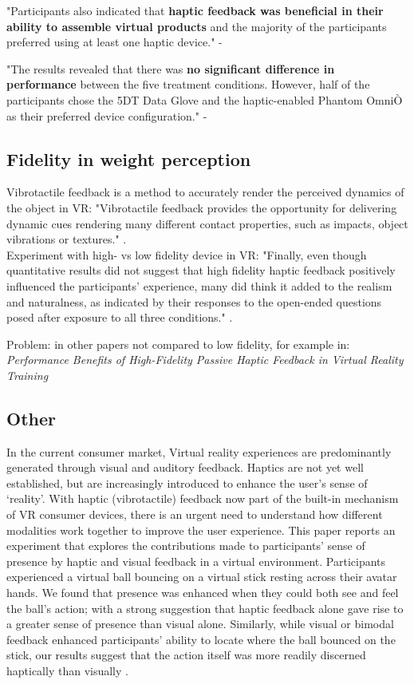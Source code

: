 "Participants also indicated that \textbf{haptic
feedback was beneficial in their ability to assemble virtual
products} and the majority of the participants preferred
using at least one haptic device." - \cite{Carlson2016}

"The results revealed that there
was \textbf{no significant difference in performance} between the
five treatment conditions. However, half of the participants
chose the 5DT Data Glove and the haptic-enabled Phantom
OmniÒ as their preferred device configuration." - \cite{Carlson2016}

\subsection{Fidelity in weight perception}
Vibrotactile feedback is a method to accurately render the perceived dynamics of the object in VR: "Vibrotactile feedback provides the opportunity for delivering dynamic cues rendering many different contact properties, such as impacts, object vibrations or textures." \cite{Cabaret2023}. \\

Experiment with high- vs low fidelity device in VR:
"Finally, even though quantitative results did not suggest that high fidelity haptic feedback positively influenced the participants' experience, many did think it added to the realism and naturalness, as indicated by their responses to the open-ended questions posed after exposure to all three conditions." \cite{Ryge2017EffectSimulation}.

Problem: in other papers not compared to low fidelity, for example in: \textit{Performance Benefits of High-Fidelity Passive Haptic Feedback in Virtual Reality Training}

\subsection{Other}

In the current consumer market, Virtual reality experiences are predominantly generated through visual and auditory feedback. Haptics are not yet well established, but are increasingly introduced to enhance the user’s sense of ‘reality’. With haptic (vibrotactile) feedback now part of the built-in mechanism of VR consumer devices, there is an urgent need to understand how different modalities work together to improve the user experience. This paper reports an experiment that explores the contributions made to participants’ sense of presence by haptic and visual feedback in a virtual environment. Participants experienced a virtual ball bouncing on a virtual stick resting across their avatar hands. We found that presence was enhanced when they could both see and feel the ball’s action; with a strong suggestion that haptic feedback alone gave rise to a greater sense of presence than visual alone. Similarly, while visual or bimodal feedback enhanced participants’ ability to locate where the ball bounced on the stick, our results suggest that the action itself was more readily discerned haptically than visually \cite{Gibbs2022AReality}. \\

